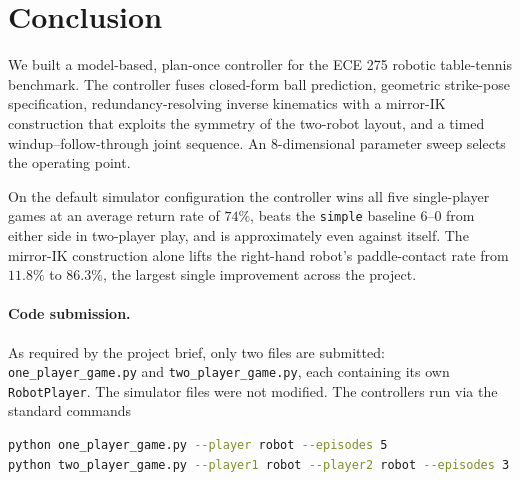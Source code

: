 \section{Conclusion}
\label{sec:conclusion}

We built a model-based, plan-once controller for the ECE 275 robotic
table-tennis benchmark. The controller fuses closed-form ball
prediction, geometric strike-pose specification, redundancy-resolving
inverse kinematics with a mirror-IK construction that exploits the
symmetry of the two-robot layout, and a timed windup--follow-through
joint sequence. An $8$-dimensional parameter sweep selects the
operating point.

On the default simulator configuration the controller wins all five
single-player games at an average return rate of $74\%$, beats the
\texttt{simple} baseline $6$--$0$ from either side in two-player
play, and is approximately even against itself. The mirror-IK
construction alone lifts the right-hand robot's paddle-contact rate
from $11.8\%$ to $86.3\%$, the largest single improvement across the
project.

\paragraph{Code submission.}
As required by the project brief, only two files are submitted:
\texttt{one\_player\_game.py} and \texttt{two\_player\_game.py}, each
containing its own \texttt{RobotPlayer}. The simulator files were not
modified. The controllers run via the standard commands
\begin{lstlisting}[style=pythonstyle,language=bash,basicstyle=\ttfamily\small]
python one_player_game.py --player robot --episodes 5
python two_player_game.py --player1 robot --player2 robot --episodes 3
\end{lstlisting}
